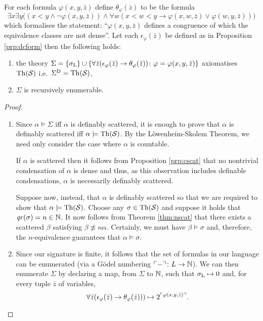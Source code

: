 \begin{prp}\label{prp:rescat}
	For each formula $\varphi(x,y,\bar{z})$ define $\theta_\varphi(\bar{z})$ to
	be the formula
	\begin{equation}
		\exists x\exists y\big((x<y\wedge\neg\varphi(x,y,\bar{z}))\wedge\forall
		w(x<w<y\rightarrow\varphi(x,w,\bar{z})\vee\varphi(w,y,\bar{z}))\big)
	\end{equation}
	which formalises the statement: ``$\varphi(x,y,\bar{z})$ defines a
	congruence of which the equivalence classes are not dense''.  Let each
	$\epsilon_\varphi(\bar{z})$ be defined as in Proposition \ref{prp:dcform}
	then the following holds:
	\begin{enumerate}
		\item the theory
			$\Sigma=\left\lbrace \sigma_{\mathrm{L}}\right\rbrace
			\cup\left\lbrace \forall\bar{z}(\epsilon_\varphi(\bar{z})
			\rightarrow\theta_\varphi(\bar{z}))\colon \varphi=\varphi(x,y,\bar{z}) \right\rbrace$
			axiomatises $\operatorname{Th}(\mathcal{S})$ i.e.\ ${\Sigma}^\mathrm{D}=\operatorname{Th}(\mathcal{S})$,

		\item $\Sigma$ is recursively enumerable.
	\end{enumerate}
	\begin{proof}
		\begin{enumerate}
			\item	Since $\alpha\models\Sigma$ iff $\alpha$ is definably
				scattered, it is enough to prove that $\alpha$ is definably
				scattered iff $\alpha\models\operatorname{Th}(\mathcal{S})$.  By the
				L\"owenheim-Skolem Theorem, we need only consider the case where
				$\alpha$ is countable.

				If $\alpha$ is scattered then it follows from Proposition
				\ref{prp:cscat} that no nontrivial condensation of $\alpha$ is
				dense and thus, as this observation includes definable
				condensations, $\alpha$ is necessarily definably scattered.

				Suppose now, instead, that $\alpha$ is definably scattered so
				that we are required to show that
				$\alpha\models\operatorname{Th}(\mathcal{S})$.  Choose any
				$\sigma\in\operatorname{Th}(\mathcal{S})$ and suppose it holds that
				$\mathit{qr}(\sigma)=n\in\mathbb{N}$.  It now follows from Theorem
				\ref{thm:nscat} that there exists a scattered $\beta$ satisfying
				$\beta\nequiv{n}\alpha$.  Certainly, we must have
				$\beta\models\sigma$ and, therefore, the $n$-equivalence
				guarantees that $\alpha\models\sigma$.

			\item	Since our signature is finite, it follows that the set of
				formulas in our language can be enumerated (via a G\"odel
				numbering $\ulcorner -\urcorner\colon L\to\mathbb{N}$).  We can then enumerate
				$\Sigma$ by declaring a map, from $\Sigma$ to $\mathbb{N}$, such that
				$\sigma_{\mathrm{L}}\mapsto 0$ and, for every tuple $\bar{z}$ of variables,
				\begin{equation}
					\forall\bar{z}(\epsilon_\varphi(\bar{z})
					\rightarrow\theta_\varphi(\bar{z})))\mapsto
					2^{\ulcorner \varphi(x,y,\bar{z})\urcorner}.\label{eq:regod}
				\end{equation}


\end{enumerate}
\end{proof}
\end{prp}
